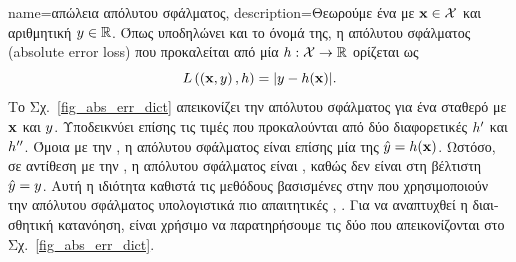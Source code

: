 {name={\foreignlanguage{greek}{απώλεια απόλυτου σφάλματος}},
	description={\foreignlanguage{greek}{Θεωρούμε ένα}  \foreignlanguage{greek}{με}  
		${\bf x} \in \mathcal{X}$ \foreignlanguage{greek}{και αριθμητική}  $y \in \mathbb{R}$. 
		\foreignlanguage{greek}{Όπως υποδηλώνει και το όνομά της, η}  \foreignlanguage{greek}{απόλυτου 
		σφάλματος} (absolute error loss)
		\foreignlanguage{greek}{που προκαλείται από μία}  $h: \mathcal{X} \rightarrow \mathbb{R}$ 
		\foreignlanguage{greek}{ορίζεται ως} $$L\left(\left( {\bf x},y \right),h \right) = |y - h({\bf x})|.$$
		\foreignlanguage{greek}{Το Σχ.}\ \ref{fig_abs_err_dict} \foreignlanguage{greek}{απεικονίζει την}  
		\foreignlanguage{greek}{απόλυτου σφάλματος για ένα σταθερό}  \foreignlanguage{greek}{με} 
		 ${\bf x}$ \foreignlanguage{greek}{και}  $y$. 
		\foreignlanguage{greek}{Υποδεικνύει επίσης τις τιμές}  \foreignlanguage{greek}{που προκαλούνται 
		από δύο διαφορετικές}  $h'$ \foreignlanguage{greek}{και} $h''$. 
		\foreignlanguage{greek}{Όμοια με την} , \foreignlanguage{greek}{η}  
		\foreignlanguage{greek}{απόλυτου σφάλματος είναι επίσης μία}   
		\foreignlanguage{greek}{της}  $\hat{y}=h({\bf x})$. 
		\foreignlanguage{greek}{Ωστόσο, σε αντίθεση με την} , \foreignlanguage{greek}{η}  
		\foreignlanguage{greek}{απόλυτου σφάλματος είναι} , \foreignlanguage{greek}{καθώς δεν είναι}  
		 \foreignlanguage{greek}{στη βέλτιστη}  $\hat{y}=y$. 
		\foreignlanguage{greek}{Αυτή η ιδιότητα καθιστά τις μεθόδους βασισμένες στην}  
		\foreignlanguage{greek}{που χρησιμοποιούν την}  \foreignlanguage{greek}{απόλυτου σφάλματος 
		υπολογιστικά πιο απαιτητικές} \cite{nesterov04}, \cite{OptMLBook}. 
	    	\foreignlanguage{greek}{Για να αναπτυχθεί η διαισθητική κατανόηση, είναι χρήσιμο να παρατηρήσουμε τις δύο} 
		 \foreignlanguage{greek}{που απεικονίζονται στο Σχ.}\ \ref{fig_abs_err_dict}. 
}}
